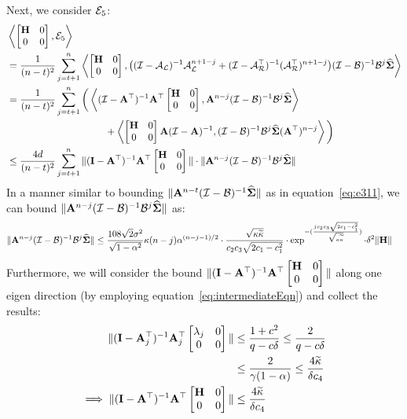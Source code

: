 Next, we consider $\mathcal{E}_5$:
\begin{align}
\label{eq:e51}
&\left\langle \begin{bmatrix}\mathbf{H}&0\\0&0\end{bmatrix}, \mathcal{E}_5 \right\rangle\nonumber\\&=\frac{1}{(n-t)^2}\sum_{j=t+1}^n\left\langle \begin{bmatrix}\mathbf{H}&0\\0&0\end{bmatrix}, \big((\mathcal{I}-\mathcal{A}_{\mathcal{L}})^{-1}\mathcal{A}_{\mathcal{L}}^{n+1-j}+(\mathcal{I}-\mathcal{A}_{\mathcal{R}}^{\top})^{-1}(\mathcal{A}_{\mathcal{R}}^{\top})^{n+1-j}\big)(\mathcal{I}-\mathcal{B})^{-1}\mathcal{B}^j\mathbf{\widehat{\Sigma}} \right\rangle\nonumber\\
&=\frac{1}{(n-t)^2}\sum_{j=t+1}^n\bigg(\left\langle (\mathcal{I}-\mathbf{A}^{\top})^{-1}\mathbf{A}^{\top}\begin{bmatrix}\mathbf{H}&0\\0&0\end{bmatrix}, \mathbf{A}^{n-j}(\mathcal{I}-\mathcal{B})^{-1}\mathcal{B}^j\mathbf{\widehat{\Sigma}} \right\rangle\nonumber\\&\qquad\qquad\qquad\qquad\qquad+\left\langle \begin{bmatrix}\mathbf{H}&0\\0&0\end{bmatrix}\mathbf{A}(\mathcal{I}-\mathbf{A})^{-1}, (\mathcal{I}-\mathcal{B})^{-1}\mathcal{B}^j\mathbf{\widehat{\Sigma}}(\mathbf{A}^{\top})^{n-j} \right\rangle\bigg)\nonumber\\
&\leq\frac{4d}{(n-t)^2}\sum_{j=t+1}^n\|(\mathbf{I}-\mathbf{A}^{\top})^{-1}\mathbf{A}^{\top}\begin{bmatrix}\mathbf{H}&0\\0&0\end{bmatrix}\|\cdot\|\mathbf{A}^{n-j}(\mathcal{I}-\mathcal{B})^{-1}\mathcal{B}^j\mathbf{\widehat{\Sigma}}\|
\end{align}
In a manner similar to bounding $\|\mathbf{A}^{n-t}(\mathcal{I}-\mathcal{B})^{-1}\mathbf{\widehat{\Sigma}}\|$ as in equation~\ref{eq:e311}, we can bound $\|\mathbf{A}^{n-j}(\mathcal{I}-\mathcal{B})^{-1}\mathcal{B}^j\mathbf{\widehat{\Sigma}}\|$ as:
\begin{align*}
\|\mathbf{A}^{n-j}(\mathcal{I}-\mathcal{B})^{-1}\mathcal{B}^j\mathbf{\widehat{\Sigma}}\|&\leq\frac{108\sqrt{2}\sigma^2}{\sqrt{1-\alpha^2}}{\kappa}(n-j)\alpha^{(n-j-1)/2}\cdot\frac{\sqrt{{\kappa}\widetilde{\kappa}}}{c_2c_3\sqrt{2c_1-c_1^2}}\cdot\exp^{-(\frac{jc_2c_3\sqrt{2c_1-c_1^2}}{\sqrt{{\kappa}\widetilde{\kappa}}})}\cdot\delta^2\|\mathbf{H}\|
\end{align*}
Furthermore, we will consider the bound $\|(\mathbf{I}-\mathbf{A}^{\top})^{-1}\mathbf{A}^{\top}\begin{bmatrix}\mathbf{H}&0\\0&0\end{bmatrix}\|$ along one eigen direction (by employing equation~\ref{eq:intermediateEqn}) and collect the results:
\begin{align*}
\|(\mathbf{I}-\mathbf{A}_j^{\top})^{-1}\mathbf{A}_j^{\top}\begin{bmatrix}\lambda_j&0\\0&0\end{bmatrix}\|&\leq\frac{1+c^2}{q-c\delta}\leq\frac{2}{q-c\delta}\\
&\leq\frac{2}{\gamma(1-\alpha)}\leq\frac{4\widetilde{\kappa}}{\delta c_4}\\
\implies\|(\mathbf{I}-\mathbf{A}^{\top})^{-1}\mathbf{A}^{\top}\begin{bmatrix}\mathbf{H}&0\\0&0\end{bmatrix}\|&\leq\frac{4\widetilde{\kappa}}{\delta c_4}
\end{align*}

